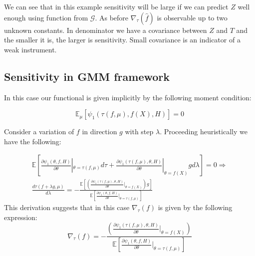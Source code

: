 \documentclass[12pt]{article}
\theoremstyle{plain}
\begin{document}
We can see that in this example sensitivity will be large if we can predict $Z$ well enough using function from $\mathcal{G}$. As before $\nabla_{\tau}(\hat f)$ is observable up to two unknown constants. In denominator we have a covariance between $Z$ and $T$ and the smaller it is, the larger is sensitivity. Small covariance is an indicator of a weak instrument.

\subsection{Sensitivity in GMM framework}

In this case our functional is given implicitly by the following moment condition:

\begin{equation}
\mathbb{E}_{\mu}[\psi_1(\tau(f,\mu),f(X),H)]  = 0
\end{equation}

Consider a variation of $f$ in direction $g$ with step $\lambda$. Proceeding heuristically we have the following:

\begin{multline}
\mathbb{E}\left[\frac{\partial \psi_1(\theta, f, H)}{\partial \theta}|_{\theta = \tau(f,\mu)} d\tau + \frac{\partial \psi_1(\tau(f,\mu),\theta, H)}{\partial \theta}|_{\theta = f(X)} gd\lambda  \right] = 0 \Rightarrow \\
\frac{d\tau(f+\lambda g,\mu)}{d\lambda} = -\frac{\mathbb{E}\left[\left(\frac{\partial \psi_1(\tau(f,\mu),\theta, H)}{\partial \theta}|_{\theta = f(X)}\right)g\right]}{\mathbb{E}\left[\frac{\partial \psi_1(\theta, f, H)}{\partial \theta}|_{\theta = \tau(f,\mu)}\right]}
\end{multline}
This derivation suggests that in this case $\nabla_{\tau}(f)$ is given by the following expression:
\begin{equation}\label{gmm_frech}
\nabla_{\tau}(f) =-  \frac{\left(\frac{\partial \psi_1(\tau(f,\mu),\theta, H)}{\partial \theta}|_{\theta = f(X)}\right)}{\mathbb{E}\left[\frac{\partial \psi_1(\theta, f, H)}{\partial \theta}|_{\theta = \tau(f,\mu)}\right]}
\end{equation}
\end{document}

